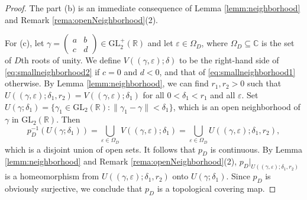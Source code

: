 \documentclass[12pt]{amsart}
\numberwithin{equation}{section}
\theoremstyle{plain}
\theoremstyle{definition}
\theoremstyle{remark}
\newcommand\tbtmat[4]{\left(\begin{smallmatrix}{#1} & {#2} \\ {#3} & {#4}\end{smallmatrix}\right)}
\newcommand\numC{\mathbb{C}}
\newcommand\glR{\mathrm{GL}_2(\mathbb{R})}
\newcommand\glpR{\mathrm{GL}_2^{+}(\mathbb{R})}
\begin{document}
\begin{appendix}
\begin{proof}
The part (b) is an immediate consequence of Lemma \ref{lemm:neighborhood} and Remark \ref{rema:openNeighborhood}(2).

For (c), let $\gamma=\tbtmat{a}{b}{c}{d}\in\glpR$ and let $\varepsilon\in \Omega_D$, where $\Omega_D\subseteq\numC$ is the set of $D$th roots of unity. We define $V((\gamma,\varepsilon);\delta)$ to be the right-hand side of \eqref{eq:smallneighborhood2} if $c=0$ and $d<0$, and that of \eqref{eq:smallneighborhood1} otherwise. By Lemma \ref{lemm:neighborhood}, we can find $r_1,r_2>0$ such that $U((\gamma,\varepsilon);\delta_1,r_2)=V((\gamma,\varepsilon);\delta_1)$ for all $0<\delta_1<r_1$ and all $\varepsilon$. Set $U(\gamma;\delta_1)=\{\gamma_1\in\glR\colon\lVert\gamma_1-\gamma\rVert<\delta_1\}$, which is an open neighborhood of $\gamma$ in $\glR$. Then
\begin{equation}
\label{eq:covering}
p_D^{-1}(U(\gamma;\delta_1))=\bigcup_{\varepsilon\in\Omega_D}V((\gamma,\varepsilon);\delta_1)=\bigcup_{\varepsilon\in\Omega_D}U((\gamma,\varepsilon);\delta_1,r_2),
\end{equation}
which is a disjoint union of open sets. It follows that $p_D$ is continuous. By Lemma \ref{lemm:neighborhood} and Remark \ref{rema:openNeighborhood}(2), $p_D\vert_{U((\gamma,\varepsilon);\delta_1,r_2)}$ is a homeomorphism from $U((\gamma,\varepsilon);\delta_1,r_2)$ onto $U(\gamma;\delta_1)$. Since $p_D$ is obviously surjective, we conclude that $p_D$ is a topological covering map.


\end{proof}
\end{appendix}
\end{document}
